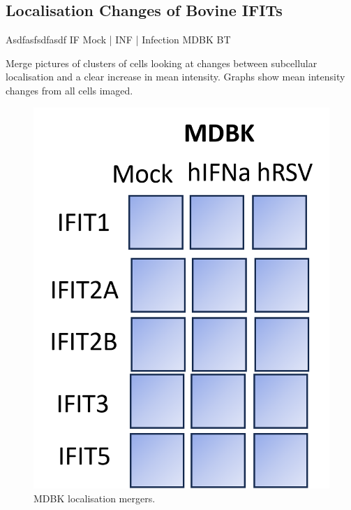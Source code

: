 \subsection{Localisation Changes of Bovine IFITs} \label{Localisation Changes of Bovine IFITs}
Asdfasfsdfasdf \newline
IF Mock | INF | Infection \newline
MDBK BT

Merge pictures of clusters of cells looking at changes between subcellular localisation and a clear increase in mean intensity. Graphs show mean intensity changes from all cells imaged.

\begin{figure}
    \centering
    \includegraphics[width=1\linewidth]{07. Chapter 2/Figs/03. Localisation/01. mdbk merges.png}
    \caption[MDBK localisation mergers.]{MDBK localisation mergers.}
    \label{MDBK localisation mergers}
\end{figure}


